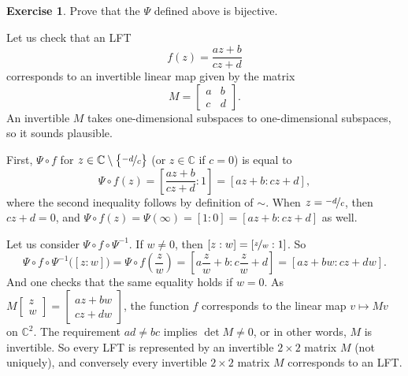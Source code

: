 \documentclass[12pt,openany]{book}
\newcommand{\C}{{\mathbb{C}}}
\theoremstyle{plain}
\theoremstyle{remark}
\theoremstyle{definition}
\newenvironment{exbox}{%
    \def\FrameCommand{\vrule width 1pt \relax\hspace{10pt}}%
    \MakeFramed{\advance\hsize-\width\FrameRestore}%
}{%
    \endMakeFramed
}
\theoremstyle{exercise}
\newtheorem{exercise}{Exercise}[section]
\theoremstyle{example}
\begin{document}
\begin{exbox}
\begin{exercise}
Prove that the $\Psi$ defined above is bijective.
\end{exercise}
\end{exbox}

Let us check that an LFT
\begin{equation*}
f(z) = \frac{a z + b}{c z + d}
\end{equation*}
corresponds to an invertible linear map given by the matrix
\begin{equation*}
M =
\begin{bmatrix}
a & b \\
c & d
\end{bmatrix} .
\end{equation*}
An invertible $M$ takes one-dimensional subspaces to one-dimensional
subspaces, so it sounds plausible.

First, $\Psi \circ f$ for $z \in \C \setminus \bigl\{ \nicefrac{-d}{c} \bigr\}$
(or $z \in \C$ if $c=0$)
is equal to
\begin{equation*}
\Psi \circ f(z) =
\left[\frac{a z + b}{c z + d}: 1 \right]
=
\left[a z + b: c z + d \right] ,
\end{equation*}
where the second inequality follows by definition of $\sim$.
When $z = \nicefrac{-d}{c}$, then $cz+d = 0$, and
$\Psi\circ f(z) = \Psi(\infty) = [1:0] = [az+b : cz+d]$ as well.

Let us consider $\Psi \circ f \circ \Psi^{-1}$.
If $w \not= 0$, then $[z:w] = [ \nicefrac{z}{w}:1 ]$.  So
\begin{equation*}
\Psi \circ f \circ \Psi^{-1} \bigl([z:w]\bigr) =
\Psi \circ f \left(\frac{z}{w}\right) =
\left[a \frac{z}{w} + b : c \frac{z}{w} + d \right] =
\left[a z + b w: c z + d w \right] .
\end{equation*}
And one checks that the same equality holds if $w=0$.
As
$M \left[ \begin{smallmatrix} z \\ w \end{smallmatrix} \right]
= \left[ \begin{smallmatrix} 
a z + b w \\ c z + d w
\end{smallmatrix} \right]$,
the function $f$ corresponds to the linear map $v \mapsto Mv$ on $\C^2$.
The requirement $ad \not= bc$ implies $\det M \not= 0$,
or in other words, $M$ is invertible.
So every LFT is represented by an invertible $2 \times 2$ matrix $M$
(not uniquely), and
conversely every invertible $2 \times 2$ matrix $M$ corresponds to an LFT.
\end{document}
